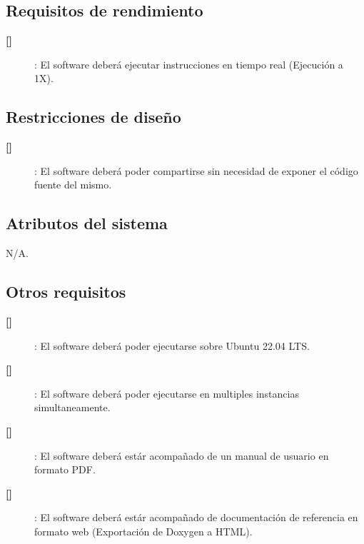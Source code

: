 \documentclass[
  11pt, %
  codirector, %
]{charter}
\makeatletter
\newcommand{\mytwodigits}[1]{\two@digits{#1}}
\newcounter{reqCounter}
\makeatother
\begin{document}
\subsection{Requisitos de rendimiento}
\label{sec:org94bc543}

\begin{description}

\item[\textbf{[\CODrequerimiento\mytwodigits{\value{reqCounter}}]}]: El software deberá ejecutar instrucciones en tiempo real (Ejecución a 1X).

\end{description}


\subsection{Restricciones de diseño}
\label{sec:org49fe900}

\begin{description}

\item[\textbf{[\CODrequerimiento\mytwodigits{\value{reqCounter}}]}]: El software deberá poder compartirse sin necesidad de exponer el código fuente del mismo.

\end{description}


\subsection{Atributos del sistema}
\label{sec:orgd0babc0}

N/A.

\subsection{Otros requisitos}
\label{sec:org31d2978}

\begin{description}

\item[\textbf{[\CODrequerimiento\mytwodigits{\value{reqCounter}}]}]: El software deberá poder ejecutarse sobre Ubuntu 22.04 LTS.


\item[\textbf{[\CODrequerimiento\mytwodigits{\value{reqCounter}}]}]: El software deberá poder ejecutarse en multiples instancias simultaneamente.

\item[\textbf{[\CODrequerimiento\mytwodigits{\value{reqCounter}}]}]: El software deberá estár acompañado de un manual de usuario en formato PDF.

\item[\textbf{[\CODrequerimiento\mytwodigits{\value{reqCounter}}]}]: El software deberá estár acompañado de documentación de referencia en formato web (Exportación de Doxygen a HTML).


\end{description}
\end{document}
